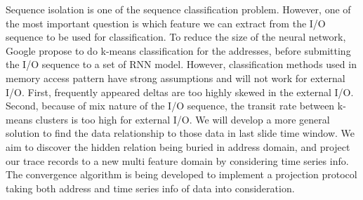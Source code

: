 Sequence isolation is one of the sequence classification problem.
However, one of the most important question is which feature we can extract from the I/O sequence to be used for classification.
To reduce the size of the neural network, Google propose to do k-means classification for the addresses,
before submitting the I/O sequence to a set of RNN model\cite{hashemi2018learning}.
However, classification methods used in memory access pattern have strong assumptions and will not work for external I/O.
First, frequently appeared deltas are too highly skewed in the external I/O.
Second, because of mix nature of the I/O sequence, the transit rate between k-means clusters is too high for external I/O.
We will develop a more general solution to find the data relationship to those data in last slide time window.
We aim to discover the hidden relation being buried in address domain,
and project our trace records to a new multi feature domain by considering time series info.
The convergence algorithm is being developed to implement a projection protocol
taking both address and time series info of data into consideration.

